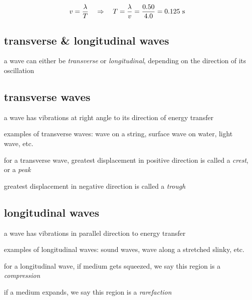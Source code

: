 
\begin{soln} \begin{equation*}
	v = \frac{\lambda}{T} \quad \Rightarrow \quad T = \frac{\lambda}{v} = \frac{0.50}{4.0} = 0.125 \text{ s} 
\end{equation*}
\end{soln}

\subsection{transverse \& longitudinal waves}

a wave can either be \emph{transverse} or \emph{longitudinal}, depending on the direction of its oscillation

\subsection{transverse waves}

\begin{ilight}
	\centering a  wave has vibrations at right angle to its direction of energy transfer 
\end{ilight}

\cmt examples of transverse waves: wave on a string, surface wave on water, light wave, etc.

\cmt for a transverse wave, greatest displacement in positive direction is called a \emph{crest}, or a \emph{peak}

greatest displacement in negative direction is called a \emph{trough}


\subsection{longitudinal waves} \label{ch-Lwaves}

\begin{ilight}
	\centering a  wave has vibrations in parallel direction to energy transfer 
\end{ilight}

\cmt examples of longitudinal waves: sound waves, wave along a stretched slinky, etc.

\cmt for a longitudinal wave, if medium gets squeezed, we say this region is a \emph{compression}

if a medium expands, we say this region is a \emph{rarefaction}

